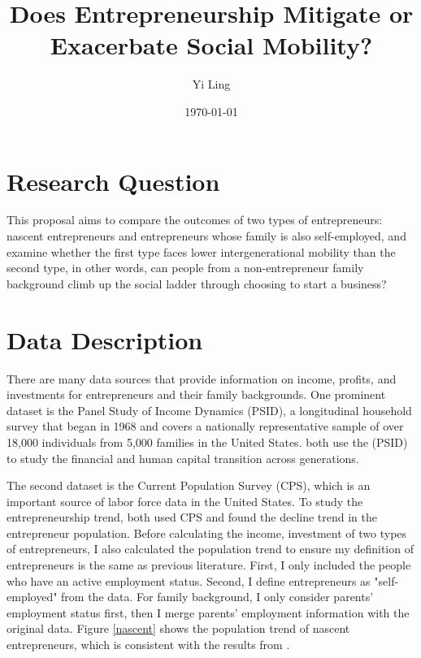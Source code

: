 



\title{\Large \textbf{Does Entrepreneurship Mitigate or Exacerbate Social Mobility? }}
\author{Yi Ling}

\date{\today}

\maketitle

\thispagestyle{empty} 
\doublespacing
\thispagestyle{empty} 

\section{Research Question}
This proposal aims to compare the outcomes of two types of entrepreneurs:  nascent entrepreneurs and entrepreneurs whose family is also self-employed, and examine whether the first type faces lower intergenerational mobility than the second type, in other words, can people from a non-entrepreneur family background climb up the social ladder through choosing to start a business?

\section{Data Description}
There are many data sources that provide information on income, profits, and investments for entrepreneurs and their family backgrounds. One prominent dataset is the Panel Study of Income Dynamics (PSID), a longitudinal household survey that began in 1968 and covers a nationally representative sample of over 18,000 individuals from 5,000 families in the United States. \citet{quadrini1999importance,fairlie1999absence} both use the  (PSID) to study the financial and human capital transition across generations. 

The second dataset is the Current Population Survey (CPS), which is an important source of labor force data in the United States. To study the entrepreneurship trend, \citet{jiang2023skill, sanchez2023decline, bento2023barriers} both used CPS and found the decline trend in the entrepreneur population. Before calculating the income, investment of two types of entrepreneurs, I also calculated the population trend to ensure my definition of entrepreneurs is the same as previous literature. First, I only included the people who have an active employment status. Second, I define entrepreneurs as "self-employed" from the data. For family background, I only consider parents' employment status first, then I merge parents' employment information with the original data. Figure \ref{nascent} shows the population trend of nascent entrepreneurs, which is consistent with the results from \citet{jiang2023skill, sanchez2023decline}.

